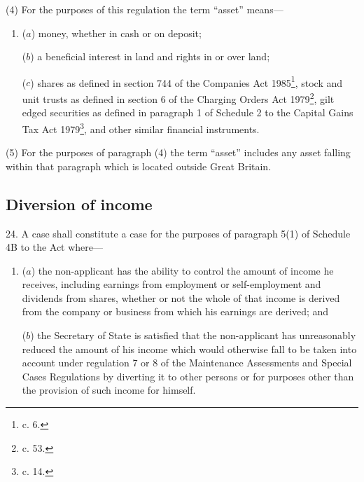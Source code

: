 \documentclass[12pt,a4paper]{article}
\begin{document}


(4) For the purposes of this regulation the term “asset” means—
\begin{enumerate}\item[]
($a$) money, whether in cash or on deposit;

($b$) a beneficial interest in land and rights in or over land;

($c$) shares as defined in section 744 of the Companies Act 1985\footnote{ c. 6.}, stock and
unit trusts as defined in section 6 of the Charging Orders Act 1979\footnote{ c. 53.}, gilt
edged securities as defined in paragraph 1 of Schedule 2 to the Capital Gains
Tax Act 1979\footnote{ c. 14.}, and other similar financial instruments.
\end{enumerate}

(5) For the purposes of paragraph (4) the term “asset” includes any asset
falling within that paragraph which is located outside Great Britain.


\subsection[24. Diversion of income]{Diversion of income}

24. A case shall constitute a case for the purposes of
paragraph 5(1) of Schedule 4B to the Act where—
\begin{enumerate}\item[]
($a$) the non-applicant has the ability to control the amount of income he
receives, including earnings from employment or self-employment and dividends
from shares, whether or not the whole of that income is derived from the company
or business from which his earnings are derived; and

($b$) the Secretary of State is satisfied that the non-applicant has unreasonably
reduced the amount of his income which would otherwise fall to be taken into
account under regulation 7 or 8 of the Maintenance Assessments and Special Cases
Regulations by diverting it to other persons or for purposes other than the
provision of such income for himself.
\end{enumerate}
\end{document}
